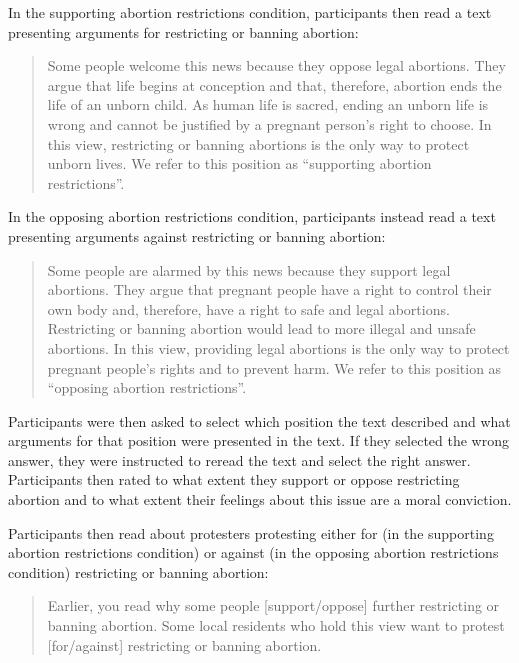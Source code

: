 \documentclass[twocolumn, 11pt, letterpaper]{article}
\begin{document}
\noindent In the supporting abortion restrictions condition,
participants then read a text presenting arguments for restricting or
banning abortion:

\begin{quote}
Some people welcome this news because they oppose legal abortions. They
argue that life begins at conception and that, therefore, abortion ends
the life of an unborn child. As human life is sacred, ending an unborn
life is wrong and cannot be justified by a pregnant person's right to
choose. In this view, restricting or banning abortions is the only way
to protect unborn lives. We refer to this position as ``supporting
abortion restrictions''.
\end{quote}

\noindent In the opposing abortion restrictions condition, participants
instead read a text presenting arguments against restricting or banning
abortion:

\begin{quote}
Some people are alarmed by this news because they support legal
abortions. They argue that pregnant people have a right to control their
own body and, therefore, have a right to safe and legal abortions.
Restricting or banning abortion would lead to more illegal and unsafe
abortions. In this view, providing legal abortions is the only way to
protect pregnant people's rights and to prevent harm. We refer to this
position as ``opposing abortion restrictions''.
\end{quote}

\noindent Participants were then asked to select which position the text
described and what arguments for that position were presented in the
text. If they selected the wrong answer, they were instructed to reread
the text and select the right answer. Participants then rated to what
extent they support or oppose restricting abortion and to what extent
their feelings about this issue are a moral conviction.

Participants then read about protesters protesting either for (in the
supporting abortion restrictions condition) or against (in the opposing
abortion restrictions condition) restricting or banning abortion:

\begin{quote}
Earlier, you read why some people {[}support/oppose{]} further
restricting or banning abortion. Some local residents who hold this view
want to protest {[}for/against{]} restricting or banning abortion.
\end{quote}
\end{document}
